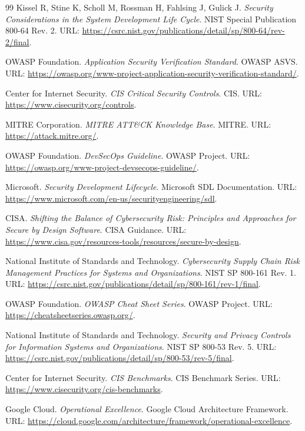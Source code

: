 \documentclass[12pt,a4paper,fontset=none]{ctexart}
\begin{document}
\begin{thebibliography}{99}
Kissel R, Stine K, Scholl M, Rossman H, Fahlsing J, Gulick J. \textit{Security Considerations in the System Development Life Cycle}. NIST Special Publication 800-64 Rev. 2. URL: \url{https://csrc.nist.gov/publications/detail/sp/800-64/rev-2/final}.

OWASP Foundation. \textit{Application Security Verification Standard}. OWASP ASVS. URL: \url{https://owasp.org/www-project-application-security-verification-standard/}.

Center for Internet Security. \textit{CIS Critical Security Controls}. CIS. URL: \url{https://www.cisecurity.org/controls}.

MITRE Corporation. \textit{MITRE ATT\&CK Knowledge Base}. MITRE. URL: \url{https://attack.mitre.org/}.

OWASP Foundation. \textit{DevSecOps Guideline}. OWASP Project. URL: \url{https://owasp.org/www-project-devsecops-guideline/}.

Microsoft. \textit{Security Development Lifecycle}. Microsoft SDL Documentation. URL: \url{https://www.microsoft.com/en-us/securityengineering/sdl}.

CISA. \textit{Shifting the Balance of Cybersecurity Risk: Principles and Approaches for Secure by Design Software}. CISA Guidance. URL: \url{https://www.cisa.gov/resources-tools/resources/secure-by-design}.

National Institute of Standards and Technology. \textit{Cybersecurity Supply Chain Risk Management Practices for Systems and Organizations}. NIST SP 800-161 Rev. 1. URL: \url{https://csrc.nist.gov/publications/detail/sp/800-161/rev-1/final}.

OWASP Foundation. \textit{OWASP Cheat Sheet Series}. OWASP Project. URL: \url{https://cheatsheetseries.owasp.org/}.

National Institute of Standards and Technology. \textit{Security and Privacy Controls for Information Systems and Organizations}. NIST SP 800-53 Rev. 5. URL: \url{https://csrc.nist.gov/publications/detail/sp/800-53/rev-5/final}.

Center for Internet Security. \textit{CIS Benchmarks}. CIS Benchmark Series. URL: \url{https://www.cisecurity.org/cis-benchmarks}.

Google Cloud. \textit{Operational Excellence}. Google Cloud Architecture Framework. URL: \url{https://cloud.google.com/architecture/framework/operational-excellence}.


\end{thebibliography}
\end{document}
